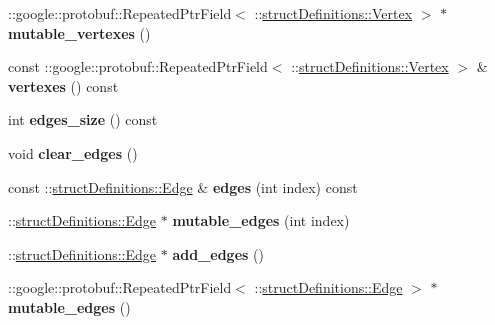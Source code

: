 \begin{DoxyCompactItemize}
\item 
\hypertarget{classstruct_definitions_1_1_data_package_ad4ef0b52c48ff510e8072ad2ef78b2cc}{}\label{classstruct_definitions_1_1_data_package_ad4ef0b52c48ff510e8072ad2ef78b2cc} 
\+::google\+::protobuf\+::\+Repeated\+Ptr\+Field$<$ \+::\hyperlink{classstruct_definitions_1_1_vertex}{struct\+Definitions\+::\+Vertex} $>$ $\ast$ {\bfseries mutable\+\_\+vertexes} ()
\item 
\hypertarget{classstruct_definitions_1_1_data_package_a2ed3fb01bb01f9068154ccc7f98d3551}{}\label{classstruct_definitions_1_1_data_package_a2ed3fb01bb01f9068154ccc7f98d3551} 
const \+::google\+::protobuf\+::\+Repeated\+Ptr\+Field$<$ \+::\hyperlink{classstruct_definitions_1_1_vertex}{struct\+Definitions\+::\+Vertex} $>$ \& {\bfseries vertexes} () const
\item 
\hypertarget{classstruct_definitions_1_1_data_package_a2cb4fd2c5bee5adf51e40a6ddd3e5392}{}\label{classstruct_definitions_1_1_data_package_a2cb4fd2c5bee5adf51e40a6ddd3e5392} 
int {\bfseries edges\+\_\+size} () const
\item 
\hypertarget{classstruct_definitions_1_1_data_package_a28c6262f9d8dfe5def32d9c19452042d}{}\label{classstruct_definitions_1_1_data_package_a28c6262f9d8dfe5def32d9c19452042d} 
void {\bfseries clear\+\_\+edges} ()
\item 
\hypertarget{classstruct_definitions_1_1_data_package_a90cd602eeb3066feb2a13d7406a09c18}{}\label{classstruct_definitions_1_1_data_package_a90cd602eeb3066feb2a13d7406a09c18} 
const \+::\hyperlink{classstruct_definitions_1_1_edge}{struct\+Definitions\+::\+Edge} \& {\bfseries edges} (int index) const
\item 
\hypertarget{classstruct_definitions_1_1_data_package_a0ef53ec1026ed650998987da9eea0130}{}\label{classstruct_definitions_1_1_data_package_a0ef53ec1026ed650998987da9eea0130} 
\+::\hyperlink{classstruct_definitions_1_1_edge}{struct\+Definitions\+::\+Edge} $\ast$ {\bfseries mutable\+\_\+edges} (int index)
\item 
\hypertarget{classstruct_definitions_1_1_data_package_a9443ced07c253585ef81814c2d019076}{}\label{classstruct_definitions_1_1_data_package_a9443ced07c253585ef81814c2d019076} 
\+::\hyperlink{classstruct_definitions_1_1_edge}{struct\+Definitions\+::\+Edge} $\ast$ {\bfseries add\+\_\+edges} ()
\item 
\hypertarget{classstruct_definitions_1_1_data_package_a993a053c71571c2e4b48a62d51929725}{}\label{classstruct_definitions_1_1_data_package_a993a053c71571c2e4b48a62d51929725} 
\+::google\+::protobuf\+::\+Repeated\+Ptr\+Field$<$ \+::\hyperlink{classstruct_definitions_1_1_edge}{struct\+Definitions\+::\+Edge} $>$ $\ast$ {\bfseries mutable\+\_\+edges} ()

\end{DoxyCompactItemize}
